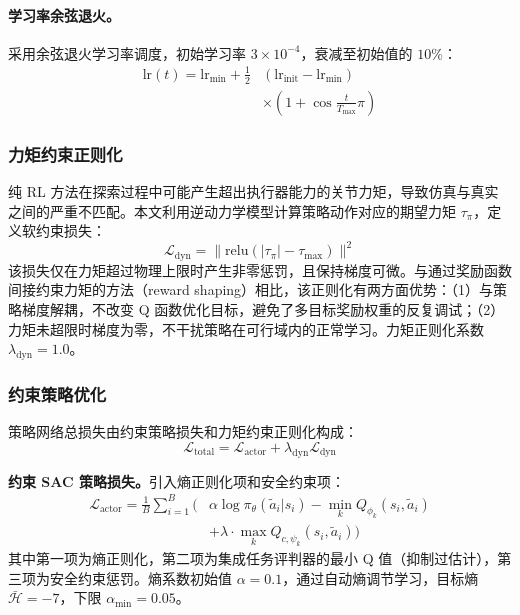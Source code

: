 \documentclass[10pt,conference]{IEEEtran}
\begin{document}
\paragraph{学习率余弦退火。}采用余弦退火学习率调度，初始学习率 $3 \times 10^{-4}$，衰减至初始值的 $10\%$：
\begin{equation}
\begin{aligned}
\text{lr}(t) = \text{lr}_{\min} + \frac{1}{2}&(\text{lr}_{\text{init}} - \text{lr}_{\min}) \\
&\times \left(1 + \cos\frac{t}{T_{\max}}\pi\right)
\end{aligned}
\label{eq:cosine_lr}
\end{equation}

\subsubsection{力矩约束正则化}
\label{sec:torque_reg}
纯 RL 方法在探索过程中可能产生超出执行器能力的关节力矩，导致仿真与真实之间的严重不匹配。本文利用逆动力学模型计算策略动作对应的期望力矩 $\tau_\pi$，定义软约束损失：
\begin{equation}
\mathcal{L}_{\text{dyn}} = \|\text{relu}(|\tau_\pi| - \tau_{\max})\|^2
\label{eq:torque_loss}
\end{equation}
该损失仅在力矩超过物理上限时产生非零惩罚，且保持梯度可微。与通过奖励函数间接约束力矩的方法（reward shaping）相比，该正则化有两方面优势：（1）与策略梯度解耦，不改变 Q 函数优化目标，避免了多目标奖励权重的反复调试；（2）力矩未超限时梯度为零，不干扰策略在可行域内的正常学习。力矩正则化系数 $\lambda_{\text{dyn}} = 1.0$。

\subsubsection{约束策略优化}
\label{sec:constrained_actor}
策略网络总损失由约束策略损失和力矩约束正则化构成：
\begin{equation}
\mathcal{L}_{\text{total}} = \mathcal{L}_{\text{actor}} + \lambda_{\text{dyn}} \mathcal{L}_{\text{dyn}}
\label{eq:total_loss}
\end{equation}

\textbf{约束 SAC 策略损失。}引入熵正则化项和安全约束项：
\begin{equation}
\begin{aligned}
\mathcal{L}_{\text{actor}} = \frac{1}{B}\sum_{i=1}^{B} \bigl( &\alpha \log \pi_\theta(\tilde{a}_i|s_i) - \min_k Q_{\phi_k}(s_i, \tilde{a}_i) \\
&+ \lambda \cdot \max_k Q_{c,\psi_k}(s_i, \tilde{a}_i) \bigr)
\end{aligned}
\label{eq:actor_loss}
\end{equation}
其中第一项为熵正则化，第二项为集成任务评判器的最小 Q 值（抑制过估计），第三项为安全约束惩罚。熵系数初始值 $\alpha=0.1$，通过自动熵调节学习，目标熵 $\bar{\mathcal{H}} = -7$，下限 $\alpha_{\min}=0.05$。
\end{document}
